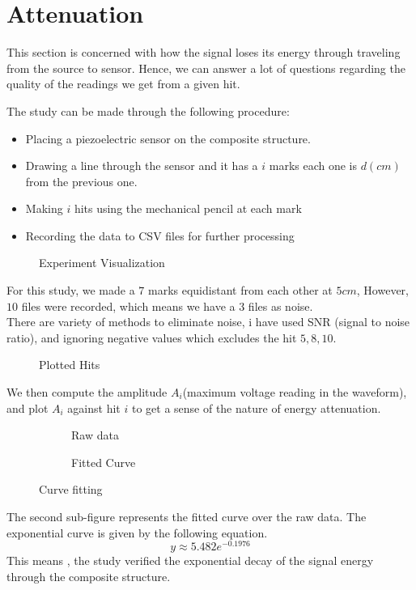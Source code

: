\section{Attenuation}

This section is concerned with how the signal loses its energy through
traveling from the source to  sensor. Hence, we can answer a lot of
questions regarding the quality of the readings we get from a given hit.

The study can be made through the following procedure:

\begin{itemize}

\item
  Placing a piezoelectric sensor on the composite structure.
\item
  Drawing a line through the sensor and it has a {\(i\)} marks each one
  is {\(d(cm)\)} from the previous one.
\item
  Making {\(i\)} hits using the mechanical pencil at each mark
\item
  Recording the data to CSV files for further processing
\end{itemize}

    \begin{figure}[htbp]
        \centering
        \scalebox{1.2}{}
        \caption{Experiment Visualization }
        \label{fig:label}
    \end{figure}

For this study, we made a {\(7\)} marks equidistant from each other at
{\(5cm\)}, However, {\(10\)} files were recorded, which means we have a
3 files as noise.\\
There are variety of methods to eliminate noise, i have used SNR (signal
to noise ratio), and ignoring negative values which excludes the hit
{\(5,8,10\)}.

    \begin{figure}[htbp]
        \centering
        \scalebox{0.5}{}
        \caption{Plotted Hits }
        \label{fig:label}
    \end{figure}
We then compute the amplitude {\(A_{i}\)}(maximum voltage reading in the
waveform), and plot {\(A_{i}\)} against hit {\(i\)} to get a sense of
the nature of energy attenuation.\\

\begin{figure}[htp]
\begin{subfigure}{0.5\textwidth}
    \centering
   \scalebox{.3}{}
  \caption{Raw data}
  \label{fig:sub1}
\end{subfigure}%
\begin{subfigure}{0.5\textwidth}
 \centering
   \scalebox{.3}{}
  \caption{Fitted Curve}
  \label{fig:sub2}
\end{subfigure}
\caption{Curve fitting}
\label{fig:test}
\end{figure}


The second sub-figure represents the fitted curve over the raw data. The
exponential curve is given by the following equation.\\
{\[y \approx 5.482e^{- 0.1976}\]}This means , the study verified the
exponential decay of the signal energy through the composite structure.

